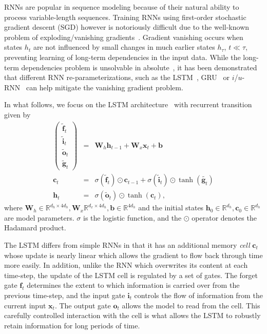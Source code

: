 \documentclass{article} %
\newcommand{\vect}[1]{\mathbf{#1}}
\newcommand{\mat}[1]{\mathbf{#1}}
\newcommand{\ewprod}{\odot}
\newcommand{\reals}{\mathbb{R}}
\begin{document}
RNNs are popular in sequence modeling because of their natural ability to process variable-length sequences.
Training RNNs using first-order stochastic gradient descent (SGD) however is notoriously difficult
due to the well-known problem of exploding/vanishing gradients~\cite{bengio1994learning,hochreiter1991untersuchungen,pascanudifficulty}.
Gradient vanishing occurs when states $h_t$ are not influenced by small changes in much earlier states $h_{\tau}$, $t \ll \tau$,
preventing learning of long-term dependencies in the input data.
While the long-term dependencies problem is unsolvable in absolute~\cite{bengio1994learning},
it has been demonstrated that different RNN re-parameterizations, such as the LSTM~\cite{lstm}, GRU~\cite{cho2014learning} or $i$/$u$-RNN~\cite{le2015simple,urnn}
can help mitigate the vanishing gradient problem.

In what follows, we focus on the LSTM architecture~\cite{lstm} with recurrent transition given by
\begin{eqnarray}
\left(\begin{array}{ccc}
\tilde{\vect{f}}_t \\
\tilde{\vect{i}}_t \\
\tilde{\vect{o}}_t \\
\tilde{\vect{g}}_t
\end{array}\right)
 &=&
 \mat{W}_h \vect{h}_{t-1} +
 \mat{W}_x \vect{x}_t +
 \vect{b}
 \\
\vect{c}_t &= &\sigma(\tilde{\vect{f}}_t) \ewprod \vect{c}_{t-1} +
\sigma(\tilde{\vect{i}}_t) \ewprod \tanh(\tilde{\vect{g}_t}) \\
\vect{h}_t &= &\sigma(\tilde{\vect{o}}_t) \ewprod \tanh(\vect{c}_t),
\end{eqnarray}
where $\vect{W}_h \in \reals^{d_h \times 4 d_h}, \vect{W}_x \reals^{d_x \times 4 d_h}, \vect{b} \in \reals^{4 d_h}$
and the initial states $\vect{h}_0 \in \reals^{d_h}, \vect{c}_0 \in \reals^{d_h}$ %
are model parameters.
$\sigma$ is the logistic function, and the $\ewprod$ operator denotes the Hadamard product.

The LSTM differs from simple RNNs in that it has an additional memory \emph{cell} $\vect{c}_t$ whose update is nearly linear which allows the gradient to flow back through time more easily.
In addition, unlike the RNN which overwrites its content at each time-step,
the update of the LSTM cell is regulated by a set of gates.
The forget gate $\vect{f}_t$ determines the extent to which information is carried over from the previous time-step,
and the input gate $\vect{i}_t$ controls the flow of information from the current input $\vect{x}_t$.
The output gate $\vect{o}_t$ allows the model to read from the cell.
This carefully controlled interaction with the cell is what allows the LSTM to robustly retain information for long periods of time.
\end{document}
